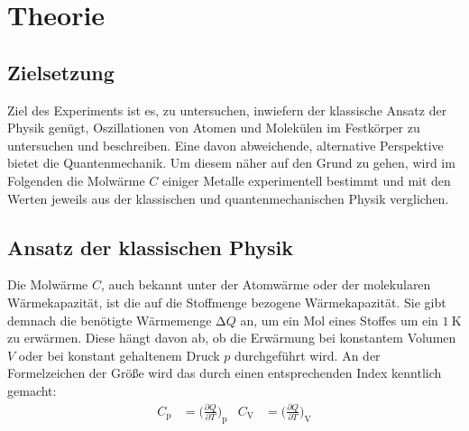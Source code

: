 \section{Theorie}%
\label{sec:Theorie}
\subsection{Zielsetzung}
    Ziel des Experiments ist es, zu untersuchen, inwiefern der klassische Ansatz der Physik genügt, Oszillationen von 
    Atomen und Molekülen im Festkörper zu untersuchen und beschreiben. 
    Eine davon abweichende, alternative Perspektive bietet die Quantenmechanik. 
    Um diesem näher auf den Grund zu gehen, wird im Folgenden die Molwärme $C$ einiger Metalle experimentell bestimmt und 
    mit den Werten jeweils aus der klassischen und quantenmechanischen Physik verglichen. 
\subsection{Ansatz der klassischen Physik}
    Die Molwärme $C$, auch bekannt unter der Atomwärme oder der molekularen Wärmekapazität, ist die auf die 
    Stoffmenge bezogene Wärmekapazität. 
    Sie gibt demnach die benötigte Wärmemenge $\increment Q$ an, um ein Mol eines Stoffes um ein $\SI{1}{\kelvin}$ zu erwärmen.
    Diese hängt davon ab, ob die Erwärmung bei konstantem Volumen $V$ oder bei konstant gehaltenem Druck $p$ durchgeführt 
    wird. An der Formelzeichen der Größe wird das durch einen entsprechenden Index kenntlich gemacht: 
    \begin{align*}
        C_{\text{p}} &= \biggl(\frac{\partial Q}{\partial T}\biggr)_{\text{p}} &
        C_{\text{V}} &= \biggl(\frac{\partial Q}{\partial T}\biggr)_{\text{V}} \\
    \end{align*}

